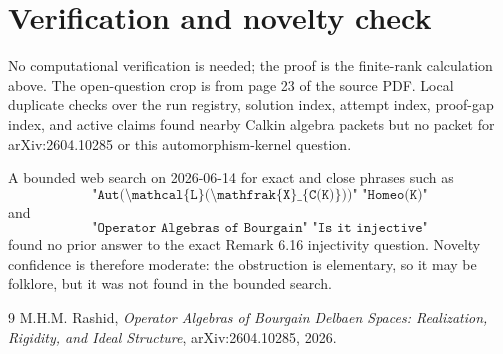 \documentclass[11pt]{article}
\begin{document}
\section*{Verification and novelty check}

No computational verification is needed; the proof is the finite-rank
calculation above.  The open-question crop is from page 23 of the source
PDF.  Local duplicate checks over the run registry, solution index,
attempt index, proof-gap index, and active claims found nearby Calkin
algebra packets but no packet for arXiv:2604.10285 or this
automorphism-kernel question.

A bounded web search on 2026-06-14 for exact and close phrases such as
\[
\texttt{"Aut(\textbackslash mathcal\{L\}(\textbackslash mathfrak\{X\}\_\{C(K)\}))" "Homeo(K)"}
\]
and
\[
\texttt{"Operator Algebras of Bourgain" "Is it injective"}
\]
found no prior answer to the exact Remark 6.16 injectivity question.
Novelty confidence is therefore moderate: the obstruction is elementary,
so it may be folklore, but it was not found in the bounded search.

\begin{thebibliography}{9}
M.H.M. Rashid,
\emph{Operator Algebras of Bourgain Delbaen Spaces: Realization,
Rigidity, and Ideal Structure},
arXiv:2604.10285, 2026.
\end{thebibliography}
\end{document}
